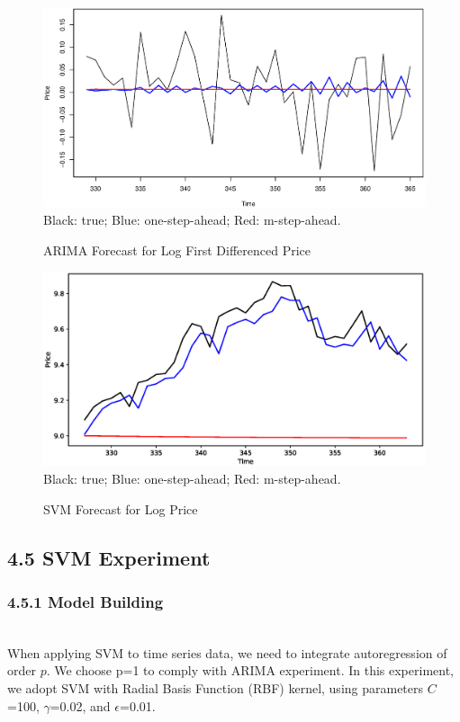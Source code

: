 \documentclass[letterpaper]{article} %
\begin{document}
\begin{figure}
    \includegraphics[width=\linewidth]{arima_fore.eps}
    \small\centering
	Black: true; Blue: one-step-ahead; Red: m-step-ahead.
    \caption{ARIMA Forecast for Log First Differenced Price}
    \label{figure:arima}
\end{figure}

\begin{figure}
    \includegraphics[width=\linewidth]{svm_fore.eps}
    \small\centering
    Black: true; Blue: one-step-ahead; Red: m-step-ahead.
    \caption{SVM Forecast for Log Price}
    \label{figure:svm}
\end{figure}

\subsection{4.5 SVM Experiment}
\subsubsection*{4.5.1 Model Building}~\\
When applying SVM to time series data, we need to integrate autoregression of order $p$. We choose p=1 to comply with ARIMA experiment. In this experiment, we adopt SVM with Radial Basis Function (RBF) kernel, using parameters $C$=100, $\gamma$=0.02, and $\epsilon$=0.01.
\end{document}
